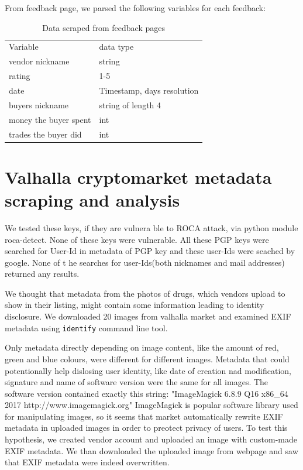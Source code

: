 \documentclass[
  digital, %
  table,   %
  lof,     %
  lot,     %
  oneside
]{fithesis3}
\begin{document}
From feedback page, we parsed the following variables for each feedback:
\begin{table}
    \caption{Data scraped from feedback pages}
    \label{cryptomarkets}
    \begin{tabular}{|l|l|}
 Variable & data type\\
vendor nickname & string\\
rating & 1-5\\
date & Timestamp, days resolution\\
buyers nickname & string of length 4\\
money the buyer spent & int\\
trades the buyer did & int\\
   
    \end{tabular}
\end{table}
\section{Valhalla cryptomarket metadata scraping and analysis}

We tested these keys, if they are vulnera ble to ROCA attack, via python module roca-detect. None of these keys were vulnerable.
All these PGP keys were searched for User-Id in metadata of PGP key and these user-Ids were seached by google. None of t
he searches for user-Ids(both nicknames and mail addresses) returned any results.

We thought that metadata from the photos of drugs, which vendors upload
to show in their listing, might contain some information leading to identity disclosure.
We downloaded 20 images from valhalla market and examined 
EXIF metadata using \texttt{identify} command line tool.

Only metadata directly depending on image content, like the amount of red, green and blue colours,
were different for different images.
Metadata that could potentionally help dislosing user identity,
like date of creation nad modification, signature and name of software version were the same for all images.
The software version contained exactly this string:
"ImageMagick 6.8.9 Q16 x86\_64 2017 http://www.imagemagick.org"
ImageMagick is popular software library used for manipulating images, so it seems
that market automatically rewrite EXIF metadata in uploaded images in order to preotect privacy of users.
To test this hypothesis, we created vendor account and uploaded an image with
custom-made EXIF metadata. We than downloaded the uploaded image from webpage and 
saw that EXIF metadata were indeed overwritten.
\end{document}
